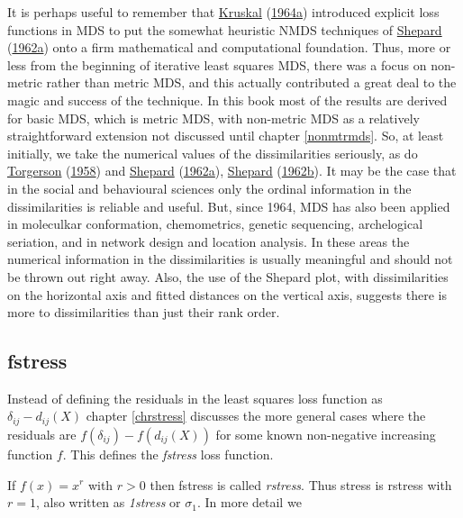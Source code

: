 \documentclass[
  12pt,
]{book}
\theoremstyle{definition}
\theoremstyle{definition}
\theoremstyle{definition}
\theoremstyle{definition}
\theoremstyle{remark}
\begin{document}
It is perhaps useful to remember that \protect\hyperlink{ref-kruskal_64a}{Kruskal} (\protect\hyperlink{ref-kruskal_64a}{1964a}) introduced explicit loss functions in MDS to put the somewhat heuristic NMDS techniques of \protect\hyperlink{ref-shepard_62a}{Shepard} (\protect\hyperlink{ref-shepard_62a}{1962a}) onto a firm mathematical and computational foundation. Thus, more or less from the beginning of iterative least squares MDS, there was a focus on non-metric rather than metric MDS, and this actually contributed a great deal to the magic and success of the technique. In this book most of the results are derived for basic MDS, which is metric MDS, with non-metric MDS as a relatively straightforward extension not discussed until chapter \ref{nonmtrmds}. So, at least initially, we take the numerical values of the dissimilarities seriously, as do \protect\hyperlink{ref-torgerson_58}{Torgerson} (\protect\hyperlink{ref-torgerson_58}{1958}) and \protect\hyperlink{ref-shepard_62a}{Shepard} (\protect\hyperlink{ref-shepard_62a}{1962a}), \protect\hyperlink{ref-shepard_62b}{Shepard} (\protect\hyperlink{ref-shepard_62b}{1962b}).
It may be the case that in the social and behavioural sciences only the ordinal information in the dissimilarities is reliable and useful. But, since 1964, MDS has also been applied in moleculkar conformation, chemometrics, genetic sequencing, archelogical seriation, and in network design and location analysis. In these areas the numerical information in the dissimilarities is usually meaningful and should not be thrown out right away. Also, the use of the Shepard plot, with dissimilarities on the horizontal axis and fitted distances on the
vertical axis, suggests there is more to dissimilarities than just their rank order.

\hypertarget{genfstress}{%
\subsection{fstress}\label{genfstress}}

Instead of defining the residuals in the least squares loss function as \(\delta_{ij}-d_{ij}(X)\) chapter \ref{chrstress} discusses the more general cases where the residuals are \(f(\delta_{ij})-f(d_{ij}(X))\) for some known non-negative increasing function \(f\). This defines the \emph{fstress} loss function.

If \(f(x)=x^r\) with \(r>0\) then fstress is called \emph{rstress}. Thus stress is rstress with \(r=1\), also written as \emph{1stress} or \(\sigma_1\). In more detail we
\end{document}
